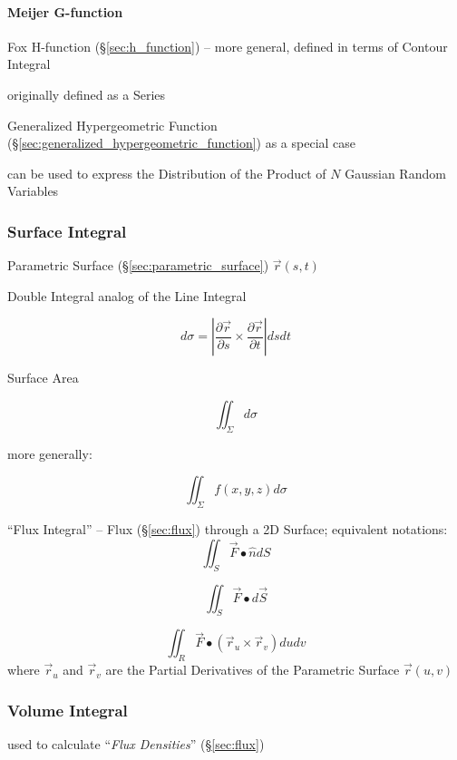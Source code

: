 {\paragraph{Meijer G-function}\label{sec:g_function}\hfill

\fist Fox H-function (\S\ref{sec:h_function}) -- more general, defined in terms
of Contour Integral

originally defined as a Series

Generalized Hypergeometric Function
(\S\ref{sec:generalized_hypergeometric_function}) as a special case

can be used to express the Distribution of the Product of $N$ Gaussian Random
Variables



\subsubsection{Surface Integral}\label{sec:surface_integral}

Parametric Surface (\S\ref{sec:parametric_surface})
$\vec{r}(s,t)$

Double Integral analog of the Line Integral

\[
  d\sigma =
    |\frac{\partial{\vec{r}}}{\partial{s}}
      \times \frac{\partial{\vec{r}}}{\partial{t}}| ds dt
\]

Surface Area

\[
  {\iint}_{\Sigma} d\sigma
\]

more generally:

\[
  {\iint}_{\Sigma} f(x,y,z) d\sigma
\]

``Flux Integral'' -- Flux (\S\ref{sec:flux}) through a 2D Surface; equivalent
notations:
\[
  \iint_{S} \vec{F} \bullet \hat{n} dS
\]

\[
  \iint_{S} \vec{F} \bullet d\vec{S}
\]

\[
  \iint_{R} \vec{F} \bullet (\vec{r}_u \times \vec{r}_v) du dv
\]
where $\vec{r}_u$ and $\vec{r}_v$ are the Partial Derivatives of the Parametric
Surface $\vec{r}(u,v)$



\subsubsection{Volume Integral}\label{sec:volume_integral}

used to calculate ``\emph{Flux Densities}'' (\S\ref{sec:flux}) %



}
